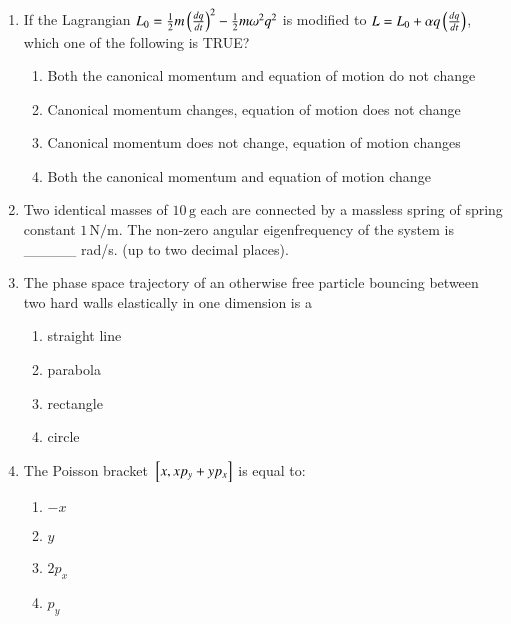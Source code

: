 \documentclass[journal,9pt,onecolumn]{IEEEtran}
\begin{document}
\begin{enumerate}
\item If the Lagrangian $L_0 = \frac{1}{2}m\left(\frac{dq}{dt}\right)^2 - \frac{1}{2}m\omega^2q^2$ is modified to $L = L_0 + \alpha q\left(\frac{dq}{dt}\right)$, which one of the following is TRUE?
\begin{enumerate}
    \item Both the canonical momentum and equation of motion do not change
    \item Canonical momentum changes, equation of motion does not change
    \item Canonical momentum does not change, equation of motion changes
    \item Both the canonical momentum and equation of motion change
\end{enumerate}


\item Two identical masses of $10 \, \text{g}$ each are connected by a massless spring of spring constant $1 \, \text{N/m}$. The non-zero angular eigenfrequency of the system is \_\_\_\_\_ rad/s. (up to two decimal places).


\item The phase space trajectory of an otherwise free particle bouncing between two hard walls elastically in one dimension is a
\begin{multicols}{4}
\begin{enumerate}
    \item straight line
    \item parabola
    \item rectangle
    \item circle
\end{enumerate}
\end{multicols}


\item The Poisson bracket ${}\left[x, xp_y + yp_x\right]$ is equal to:
\begin{multicols}{4}
\begin{enumerate}
    \item $-x$
    \item $y$
    \item $2p_x$
    \item $p_y$
\end{enumerate}
\end{multicols}
\end{enumerate}
\end{document}
